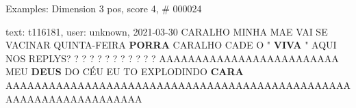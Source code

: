 \begin{frame}{Examples: Dimension 3 pos, score 4, \# 000024}
\footnotesize
\begin{exampleblock}{text: t116181, user: unknown, 2021-03-30}
CARALHO MINHA MAE VAI SE VACINAR QUINTA-FEIRA \textbf{PORRA} CARALHO CADE O " 
\textbf{VIVA} " AQUI NOS REPLYS? ? ? ? ? ? ? ? ? ? ? ? 
AAAAAAAAAAAAAAAAAAAAAAAAA MEU \textbf{DEUS} DO CÉU EU TO EXPLODINDO 
\textbf{CARA} 
AAAAAAAAAAAAAAAAAAAAAAAAAAAAAAAAAAAAAAAAAAAAAAAAAAAAAAAAAAAAAAAAAAA 
\end{exampleblock}
\end{frame}
